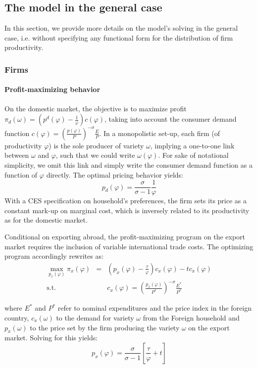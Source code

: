 \documentclass[a4paper,11pt]{article}
\begin{document}
\subsection{The model in the general case}

In this section, we provide more details on the model's solving in the general case, i.e. without specifying any functional form for the distribution of firm productivity.

\subsubsection{Firms}

\paragraph{Profit-maximizing behavior}

On the domestic market, the objective is to maximize profit $\pi_d(\omega)= \left(p^d(\varphi) -\frac{1}{\varphi}  \right)c(\varphi)$, taking into account the consumer demand function $c(\varphi) = \left(\frac{p(\varphi)}{P}  \right)^{-\sigma} \frac{E}{P}$. In a monopolistic set-up, each firm (of productivity $\varphi$) is the sole producer of variety $\omega$, implying a one-to-one link between $\omega$ and $\varphi$, such that we could write $\omega(\varphi)$. For sake of notational simplicity, we omit this link and simply write the consumer demand function as a function of $\varphi$ directly.
The optimal pricing behavior yields:
$$p_d(\varphi) = \frac{\sigma}{\sigma-1}\frac{1}{\varphi}$$
With a CES specification on household's preferences, the firm sets its price as a constant mark-up on marginal cost, which is inversely related to its productivity as for the domestic market. \medskip

Conditional on exporting abroad, the profit-maximizing program on the export market requires the inclusion of variable international trade costs. The optimizing program accordingly rewrites as:
\begin{eqnarray*}
\max_{p_x(\varphi)} \pi_x(\varphi) &=& \left(p_x(\varphi) -\frac{\tau}{\varphi}  \right)c_x(\varphi) - tc_x(\varphi) \\
\text{s.t. }&&c_x(\varphi) = \left(\frac{p_x(\varphi)}{P^\ast}  \right)^{-\sigma} \frac{E^\ast}{P^\ast}
\end{eqnarray*}

\noindent where $E^\ast$ and $P^\ast$ refer to nominal expenditures and the price index in the foreign country, $c_x(\omega)$ to the demand for variety $\omega$ from the Foreign household and $p_x(\omega)$ to the price set by the firm producing the variety $\omega$ on the export market. Solving for this yields:
\begin{equation}
p_x(\varphi) = \frac{\sigma}{\sigma-1}\left[\frac{\tau}{\varphi} +t \right] \label{eq:px}
\end{equation}
\end{document}
